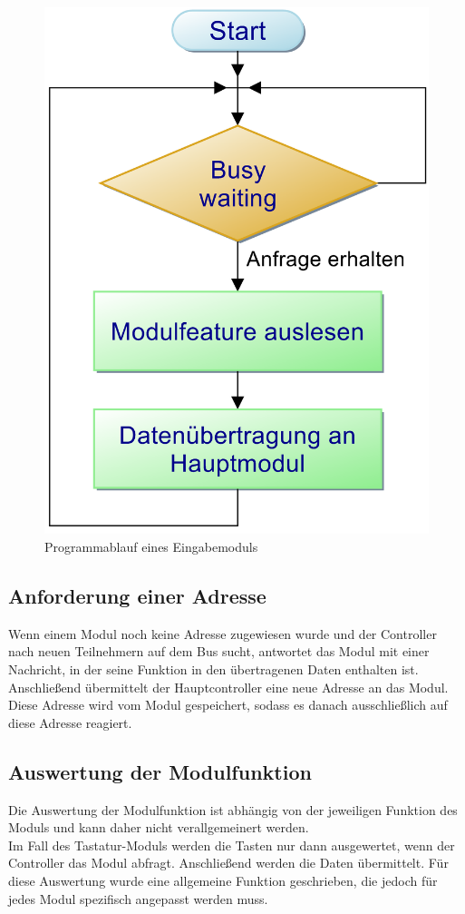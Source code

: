 \begin{figure}[H]
	\centering    
	\includegraphics[width=.75\textwidth]{Bilder/pap_eingabemodul.png}
	\caption{Programmablauf eines Eingabemoduls}
	\label{Programm_Eingabemodul}
\end{figure}

\subsection{Anforderung einer Adresse}
Wenn einem Modul noch keine Adresse zugewiesen wurde und der Controller nach neuen Teilnehmern auf dem Bus sucht, antwortet das Modul mit einer Nachricht, in der seine Funktion in den übertragenen Daten enthalten ist. Anschließend übermittelt der Hauptcontroller eine neue Adresse an das Modul. Diese Adresse wird vom Modul gespeichert, sodass es danach ausschließlich auf diese Adresse reagiert.\\




\subsection{Auswertung der Modulfunktion}
Die Auswertung der Modulfunktion ist abhängig von der jeweiligen Funktion des Moduls und kann daher nicht verallgemeinert werden.\\
Im Fall des Tastatur-Moduls werden die Tasten nur dann ausgewertet, wenn der Controller das Modul abfragt. Anschließend werden die Daten übermittelt. Für diese Auswertung wurde eine allgemeine Funktion geschrieben, die jedoch für jedes Modul spezifisch angepasst werden muss.\\

